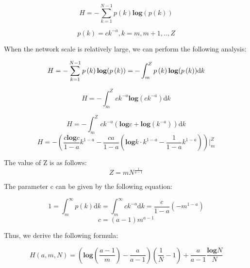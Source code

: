 \documentclass[AMA,STIX1COL]{WileyNJD-v2}
\begin{document}
\begin{equation} 
H=-\sum_{k=1}^{N-1}p\left ( k \right ) \mathbf{log} (p\left ( k \right ))
\end{equation}

\begin{equation} 
p\left ( k \right )=ck^{-a}, k = m, m+1, ..  ,Z
\end{equation}

\par When the network scale is relatively large, we can perform the following analysis:

\begin{equation} 
H=-\sum_{k=1}^{N-1}p\left ( k \right ) \mathbf{log} (p\left ( k \right )) \\ \\
=-\int_{m}^{Z}p\left ( k \right ) \mathbf{log} (p\left ( k \right ))\mathrm{d} k
\end{equation}

\begin{equation} 
H=-\int_{m}^{Z}ck^{-a}\mathbf{log} (ck^{-a})\mathrm{d} k
\end{equation}

\begin{equation} 
H=-\int_{m}^{Z}ck^{-a}\left ( \mathbf{log} c + \mathbf{log} (k^{-a})\right )\mathrm{d} k
\end{equation}
\begin{equation} 
H=-\left( \frac{c \mathbf{log}c }{1-a}k^{1-a } - \frac{ca}{1-a}\left( \mathbf{log}k\cdot k^{1-a} - \frac{1}{1-a}k^{1-a}  \right )\right )|_m^Z
\end{equation}
\par The value of Z is as follows:
\begin{equation} 
Z = mN^{\frac{1}{a-1}}
\end{equation}

\par The parameter c can be given by the following equation:


\begin{equation} 
1=\int_{m}^{\infty}p\left ( k \right )\mathrm{d} k=\int_{m}^{\infty}ck^{-a}\mathrm{d} k = \frac{c}{1-a}(-m^{1-a})
\end{equation}
\begin{equation}
c= (a-1)m^{a-1}
\end{equation}

\par Thus, we derive the following formula:

\begin{equation}
H(a,m,N)=\left ( \mathbf{log}\left ( \frac{a-1}{m} \right ) - \frac{a}{a-1} \right )(\frac{1}{N}-1)+\frac{a}{a-1}\frac{\mathbf{log}N}{N} 
\end{equation}
\end{document}
